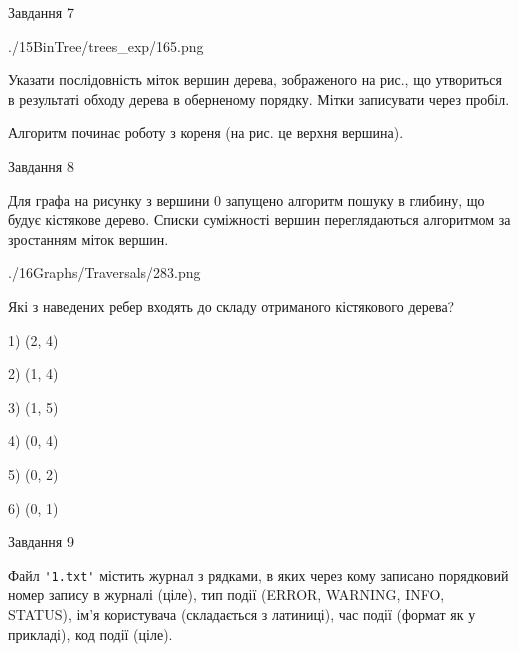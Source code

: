 \documentclass[12pt, ukrainian]{article}
\def\code#1{\Verb!#1!}
\begin{document}
{\vspace{10mm}\par

\newpage
\begin{minipage}[t]{9.7cm}
               
{\begin{center}Завдання {7}\end{center}}
\vspace{-6mm}

\begin{center}
	{./15BinTree/trees_exp/165.png}
\end{center}
Указати послідовність міток вершин дерева, зображеного на рис., що утвориться в результаті обходу дерева в оберненому порядку. Мітки записувати через пробіл.\par Алгоритм починає роботу з кореня (на рис. це верхня вершина).\par

\end{minipage}
\vline \hspace{8mm}
\begin{minipage}[t]{8.0cm}
               
{\begin{center}Завдання {8}\end{center}}
\vspace{-6mm}
Для графа на рисунку з вершини 0 запущено алгоритм пошуку в глибину, що будує кістякове дерево. Списки суміжності вершин переглядаються алгоритмом за зростанням міток вершин.\par
\begin{center}
	{./16Graphs/Traversals/283.png}
\end{center}
\par Які з наведених ребер входять до складу отриманого кістякового дерева?\par
1) (2, 4)\par
2) (1, 4)\par
3) (1, 5)\par
4) (0, 4)\par
5) (0, 2)\par
6) (0, 1)\par
{\vskip 15pt} \par

\end{minipage}

               
{\begin{center}Завдання {9}\end{center}}
\vspace{-6mm}
Файл \code{'1.txt'} містить журнал з рядками, в яких через кому записано поряд\-ко\-вий номер запису в журналі (ціле), тип події (ERROR, WARNING, INFO, STATUS), ім'я користувача (складається з латиниці), час події (фор\-мат як у прикладі), код події (ціле).

}
\end{document}
